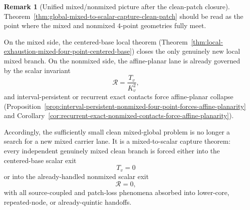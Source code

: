 \documentclass[11pt,a4paper]{amsart}
\theoremstyle{plain}
\theoremstyle{definition}
\newtheorem{remark}[theorem]{Remark}
\begin{document}
\begin{remark}[Unified mixed/nonmixed picture after the clean-patch closure]
\label{rem:unified-mixed-nonmixed-picture-after-clean-closure}
Theorem~\ref{thm:global-mixed-to-scalar-capture-clean-patch} should be read as
the point where the mixed and nonmixed $4$-point geometries fully meet.

On the mixed side, the centered-base local theorem
(Theorem~\ref{thm:local-exhaustion-mixed-four-point-centered-base}) closes the
only genuinely new local mixed branch. On the nonmixed side, the affine-planar
lane is already governed by the scalar invariant
\[
\mathcal R=\frac{T_v}{K_v^2},
\]
and interval-persistent or recurrent exact contacts force affine-planar
collapse
(Proposition~\ref{prop:interval-persistent-nonmixed-four-point-forces-affine-planarity}
and Corollary~\ref{cor:recurrent-exact-nonmixed-contacts-force-affine-planarity}).

Accordingly, the sufficiently small clean mixed-global problem is no longer a
search for a new mixed carrier lane. It is a mixed-to-scalar capture theorem:
every independent genuinely mixed clean branch is forced either into the
centered-base scalar exit
\[
T_v=0
\]
or into the already-handled nonmixed scalar exit
\[
\mathcal R=0,
\]
with all source-coupled and patch-loss phenomena absorbed into lower-core,
repeated-node, or already-quintic handoffs.
\end{remark}
\end{document}
